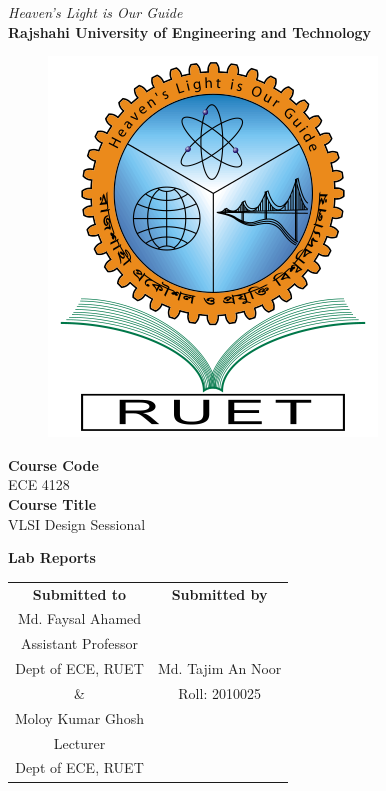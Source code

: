 \vspace*{\fill}
\begin{center}

    \emph{Heaven's Light is Our Guide} \\
    \textbf{Rajshahi University of Engineering and Technology} \\

    \begin{figure}[H]
        \centering
        \includegraphics[scale=.34]{images/RUET_logo.png}
        \label{fig:ruet_logo}
    \end{figure}
    \vspace{5mm}

    \textbf{Course Code}\\
    ECE 4128\\
    \vspace{3mm}
    \textbf{Course Title}\\
    VLSI Design Sessional

    \vspace{5mm}
    \textbf{Lab Reports}

    \vspace{5mm}
    \begin{tabular}{c|c}
        \textbf{Submitted to} & \textbf{Submitted by} \\
        Md. Faysal Ahamed     &                       \\
        Assistant Professor   &                       \\
        Dept of ECE, RUET     & Md. Tajim An Noor     \\
        \&                    & Roll: 2010025         \\
        Moloy Kumar Ghosh     &                       \\
        Lecturer              &                       \\
        Dept of ECE, RUET     &                       \\
    \end{tabular}

\end{center}
\vspace*{\fill}
